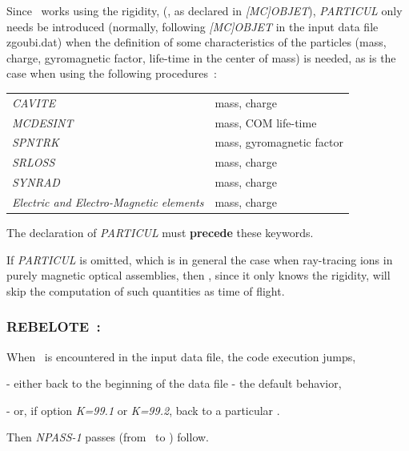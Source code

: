 Since \zgoubi\ works  using the rigidity, (\BORO, as declared in \textsl{[MC]OBJET}), 
\textsl{PARTICUL} only needs  be introduced (normally, following \textsl{[MC]OBJET} in the input data file zgoubi.dat) 
 when  the definition of some characteristics of the particles 
(mass, charge, gyromagnetic factor, life-time in the 
center of mass)  is needed, as is the case when using the following procedures~: 

\bigskip           

\begin{tabular}{>{\sl}l!{~:}l}
  CAVITE    & mass,  charge \\
  MCDESINT  & mass,  COM  life-time\\
  SPNTRK    & mass,  gyromagnetic factor \\
  SRLOSS    & mass, charge \\
  SYNRAD    & mass, charge \\
  Electric and Electro-Magnetic elements
            & mass, charge 
\end{tabular}
\bigskip           

\noindent The declaration of \textsl{PARTICUL} must \textbf{precede} these keywords. 

\medskip

\noindent
If \textsl{PARTICUL} is omitted, which is in general the case when ray-tracing ions
in purely magnetic optical assemblies, then \zgoubi, since it  only knows the rigidity, 
 will  skip the computation of  such quantities as  time of flight. 



 \newpage

\subsubsection*{REBELOTE~: \REBELOTETitl} \label{REBELOTE}    
 
\medskip


When \REBELOTE\ is encountered in the input data file, the code execution jumps, 

- either back to the beginning of the data file - the default behavior,  

- or, if option \textsl{K=99.1} or \textsl{K=99.2}, back to a particular \LABEL. 

\noindent  Then  \textsl{NPASS-1} passes (from \LABEL\ to  \REBELOTE) follow.  

